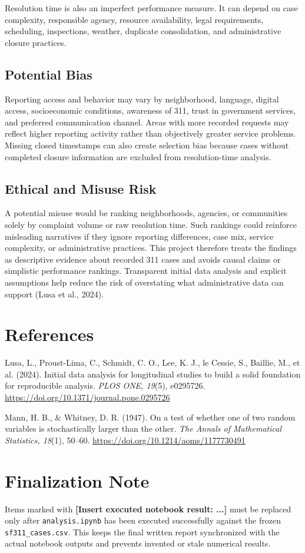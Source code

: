 \documentclass[12pt]{article}
\begin{document}
Resolution time is also an imperfect performance measure. It can depend on case complexity, responsible agency, resource availability, legal requirements, scheduling, inspections, weather, duplicate consolidation, and administrative closure practices.

\subsection*{Potential Bias}
Reporting access and behavior may vary by neighborhood, language, digital access, socioeconomic conditions, awareness of 311, trust in government services, and preferred communication channel. Areas with more recorded requests may reflect higher reporting activity rather than objectively greater service problems. Missing closed timestamps can also create selection bias because cases without completed closure information are excluded from resolution-time analysis.

\subsection*{Ethical and Misuse Risk}
A potential misuse would be ranking neighborhoods, agencies, or communities solely by complaint volume or raw resolution time. Such rankings could reinforce misleading narratives if they ignore reporting differences, case mix, service complexity, or administrative practices. This project therefore treats the findings as descriptive evidence about recorded 311 cases and avoids causal claims or simplistic performance rankings. Transparent initial data analysis and explicit assumptions help reduce the risk of overstating what administrative data can support (Lusa et al., 2024).

\section*{References}
Lusa, L., Proust-Lima, C., Schmidt, C. O., Lee, K. J., le Cessie, S., Baillie, M., et al. (2024). Initial data analysis for longitudinal studies to build a solid foundation for reproducible analysis. \textit{PLOS ONE, 19}(5), e0295726. \url{https://doi.org/10.1371/journal.pone.0295726}

Mann, H. B., \& Whitney, D. R. (1947). On a test of whether one of two random variables is stochastically larger than the other. \textit{The Annals of Mathematical Statistics, 18}(1), 50--60. \url{https://doi.org/10.1214/aoms/1177730491}

\section*{Finalization Note}
Items marked with \textbf{[Insert executed notebook result: ...]} must be replaced only after \texttt{analysis.ipynb} has been executed successfully against the frozen \texttt{sf311\_cases.csv}. This keeps the final written report synchronized with the actual notebook outputs and prevents invented or stale numerical results.
\end{document}
